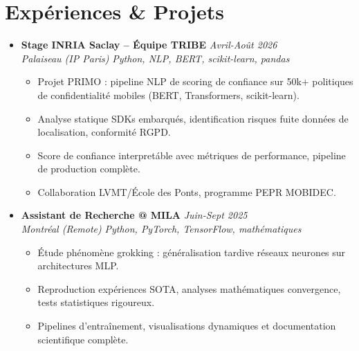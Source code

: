 \documentclass[a4paper,11pt]{article}
\begin{document}
\section{Exp\'eriences \& Projets}
\begin{itemize}[leftmargin=*, label={-}]
    \item \textbf{Stage INRIA Saclay -- \'Equipe TRIBE} \hfill \textit{Avril-Ao\^ut 2026} \\
    \textit{Palaiseau (IP Paris)} \hfill \textit{Python, NLP, BERT, scikit-learn, pandas}
    \vspace{-2pt}
    \begin{itemize}[leftmargin=0.4cm, nosep, label=\tiny$\bullet$]
        \item \small{Projet PRIMO : pipeline NLP de scoring de confiance sur 50k+ politiques de confidentialit\'e mobiles (BERT, Transformers, scikit-learn).}
        \item \small{Analyse statique SDKs embarqu\'es, identification risques fuite donn\'ees de localisation, conformit\'e RGPD.}
        \item \small{Score de confiance interpret\'able avec m\'etriques de performance, pipeline de production compl\`ete.}
        \item \small{Collaboration LVMT/\'Ecole des Ponts, programme PEPR MOBIDEC.}
    \end{itemize}
    \vspace{3pt}

    \item \textbf{Assistant de Recherche @ MILA} \hfill \textit{Juin-Sept 2025} \\
    \textit{Montr\'eal (Remote)} \hfill \textit{Python, PyTorch, TensorFlow, math\'ematiques}
    \vspace{-2pt}
    \begin{itemize}[leftmargin=0.4cm, nosep, label=\tiny$\bullet$]
        \item \small{\'Etude ph\'enomène grokking : g\'en\'eralisation tardive r\'eseaux neurones sur architectures MLP.}
        \item \small{Reproduction exp\'eriences SOTA, analyses math\'ematiques convergence, tests statistiques rigoureux.}
        \item \small{Pipelines d'entra\^inement, visualisations dynamiques et documentation scientifique compl\`ete.}
    \end{itemize}
    \vspace{3pt}


\end{itemize}
\end{document}
